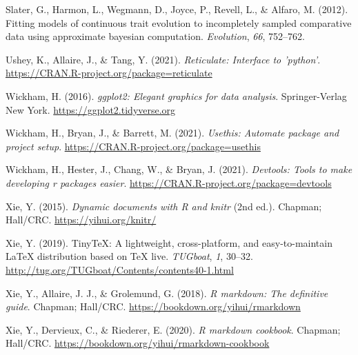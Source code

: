 \documentclass[
  man]{apa6}
\newlength{\cslhangindent}
\newlength{\cslentryspacingunit} %
\newenvironment{CSLReferences}[2] %
 {%
  \setlength{\parindent}{0pt}
  \ifodd #1
  \let\oldpar\par
  \def\par{\hangindent=\cslhangindent\oldpar}
  \fi
  \setlength{\parskip}{#2\cslentryspacingunit}
 }%
 {}
\begin{document}
\begin{CSLReferences}{1}{0}
\leavevmode{}%
Slater, G., Harmon, L., Wegmann, D., Joyce, P., Revell, L., \& Alfaro, M. (2012). Fitting models of continuous trait evolution to incompletely sampled comparative data using approximate bayesian computation. \emph{Evolution}, \emph{66}, 752--762.

\leavevmode{}%
Ushey, K., Allaire, J., \& Tang, Y. (2021). \emph{Reticulate: Interface to 'python'}. \url{https://CRAN.R-project.org/package=reticulate}

\leavevmode{}%
Wickham, H. (2016). \emph{ggplot2: Elegant graphics for data analysis}. Springer-Verlag New York. \url{https://ggplot2.tidyverse.org}

\leavevmode{}%
Wickham, H., Bryan, J., \& Barrett, M. (2021). \emph{Usethis: Automate package and project setup}. \url{https://CRAN.R-project.org/package=usethis}

\leavevmode{}%
Wickham, H., Hester, J., Chang, W., \& Bryan, J. (2021). \emph{Devtools: Tools to make developing r packages easier}. \url{https://CRAN.R-project.org/package=devtools}

\leavevmode{}%
Xie, Y. (2015). \emph{Dynamic documents with {R} and knitr} (2nd ed.). Chapman; Hall/CRC. \url{https://yihui.org/knitr/}

\leavevmode{}%
Xie, Y. (2019). TinyTeX: A lightweight, cross-platform, and easy-to-maintain LaTeX distribution based on TeX live. \emph{TUGboat}, \emph{1}, 30--32. \url{http://tug.org/TUGboat/Contents/contents40-1.html}

\leavevmode{}%
Xie, Y., Allaire, J. J., \& Grolemund, G. (2018). \emph{R markdown: The definitive guide}. Chapman; Hall/CRC. \url{https://bookdown.org/yihui/rmarkdown}

\leavevmode{}%
Xie, Y., Dervieux, C., \& Riederer, E. (2020). \emph{R markdown cookbook}. Chapman; Hall/CRC. \url{https://bookdown.org/yihui/rmarkdown-cookbook}

\end{CSLReferences}

\endgroup
\end{document}
